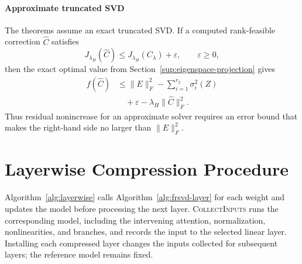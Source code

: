 \paragraph{Approximate truncated SVD}
The theorems assume an exact truncated SVD. If a computed rank-feasible correction $\widehat C$ satisfies
\begin{equation}
J_{\lambda_H}(\widehat C)
\le J_{\lambda_H}(C_\lambda)+\varepsilon,
\qquad\varepsilon\ge0,
\end{equation}
then the exact optimal value from Section~\ref{sup:eigenspace-projection} gives
\begin{equation}
\begin{aligned}
f(\widehat C)
&\le\|E\|_F^2-\sum_{i=1}^{r_2}\sigma_i^2(Z) \\
&\quad+\varepsilon-\lambda_H\|\widehat C\|_F^2.
\end{aligned}
\end{equation}
Thus residual nonincrease for an approximate solver requires an error bound that makes the right-hand side no larger than $\|E\|_F^2$.

\section{Layerwise Compression Procedure}\label{app:algorithms}

Algorithm~\ref{alg:layerwise} calls Algorithm~\ref{alg:frsvd-layer} for each weight and updates the model before processing the next layer. \textsc{CollectInputs} runs the corresponding model, including the intervening attention, normalization, nonlinearities, and branches, and records the input to the selected linear layer. Installing each compressed layer changes the inputs collected for subsequent layers; the reference model remains fixed.

